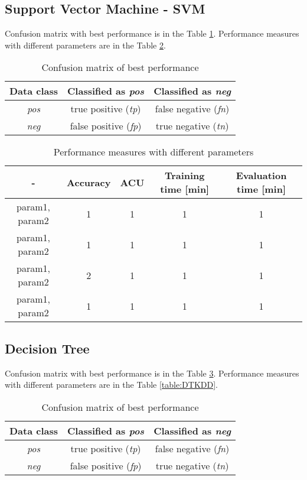 \documentclass[11pt,a4paper,titlepage]{article}
\begin{document}
\subsection{Support Vector Machine - SVM}

Confusion matrix with best performance is in the Table \ref{table:confusionMatrixSVMKDD}. Performance measures with different parameters are in the Table \ref{table:SVMKDD}.
\begin{table}
  \centering
  \begin{tabular}{| c | c | c |}
    \hline
    Data class & Classified as \textit{pos} & Classified as \textit{neg} \\ \hline
    \textit{pos} & true positive (\textit{tp}) & false negative (\textit{fn}) \\ \hline
    \textit{neg} & false positive (\textit{fp}) & true negative (\textit{tn}) \\
    \hline
  \end{tabular}
  \caption{Confusion matrix of best performance}
  \label{table:confusionMatrixSVMKDD}
  \end{table}
  
  \begin{table}
  \centering
  \begin{tabular}{| c | c | c | c | c |}
    \hline
     		-	   & Accuracy & 	ACU 	& Training time [min] & Evaluation time [min] \\ \hline
    param1, param2 &  1 	  &     1		& 		1			  & 		1 		\\ \hline
    param1, param2 & 	1	  & 	1 		& 		1			  &			1 		\\ \hline
    param1, param2 & 	2	  & 	1		& 		1			  &			1		\\ \hline
    param1, param2 &  1       & 	1		& 		1			  &			1			\\
    \hline
  \end{tabular}
  \caption{Performance measures with different parameters}
  \label{table:SVMKDD}
  \end{table}

\subsection{Decision Tree}

Confusion matrix with best performance is in the Table \ref{table:confusionMatrixDTKDD}. Performance measures with different parameters are in the Table \ref{table:DTKDD}.
\begin{table}
  \centering
  \begin{tabular}{| c | c | c |}
    \hline
    Data class & Classified as \textit{pos} & Classified as \textit{neg} \\ \hline
    \textit{pos} & true positive (\textit{tp}) & false negative (\textit{fn}) \\ \hline
    \textit{neg} & false positive (\textit{fp}) & true negative (\textit{tn}) \\
    \hline
  \end{tabular}
  \caption{Confusion matrix of best performance}
  \label{table:confusionMatrixDTKDD}
  \end{table}
  
\end{document}
